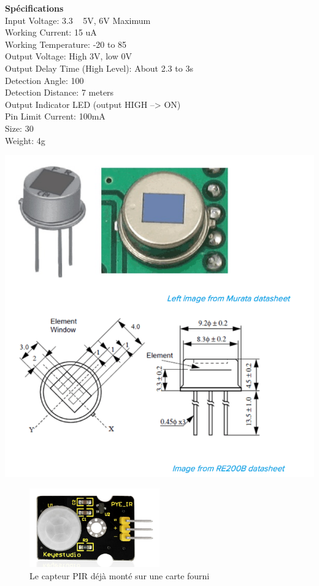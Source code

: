 \documentclass[a4paper, 11pt]{article}           %
\begin{document}
\begin{minipage}{.5\textwidth} %
\textbf{Spécifications}\\
Input Voltage: 3.3 ~ 5V, 6V Maximum \\
Working Current: 15 uA \\
Working Temperature: -20 to 85 \celsius \\
Output Voltage: High 3V, low 0V \\
Output Delay Time (High Level): About 2.3 to 3s \\
Detection Angle: 100 \degree \\
Detection Distance: 7 meters \\
Output Indicator LED (output HIGH --> ON) \\
Pin Limit Current: 100mA \\
Size: 30\*20mm \\
Weight: 4g \\
\end{minipage}
\begin{minipage}{.45\textwidth} %
\begin{center}
\includegraphics[width=\textwidth]{PIR_principle}
\end{center}
\end{minipage}

\begin{figure}[!h]
\begin{center}
\includegraphics[width=0.5\textwidth]{keyesPIR}
\caption{Le capteur PIR déjà monté sur une carte fourni}
\end{center}
\end{figure}
\end{document}
